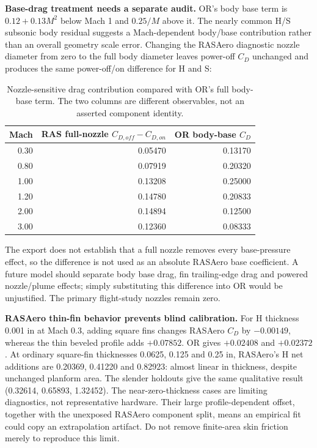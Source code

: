 \documentclass[oneside,openany]{amsdtx}
\begin{document}
\textbf{Base-drag treatment needs a separate audit.} OR's body base term is $0.12+0.13M^2$ below Mach 1 and $0.25/M$ above it. The nearly common H/S subsonic body residual suggests a Mach-dependent body/base contribution rather than an overall geometry scale error. Changing the RASAero diagnostic nozzle diameter from zero to the full body diameter leaves power-off $C_D$ unchanged and produces the same power-off/on difference for H and S:
\begin{table}[H]\centering\small
\caption{Nozzle-sensitive drag contribution compared with OR's full body-base term. The two columns are different observables, not an asserted component identity.}
\begin{tabular}{@{}rrr@{}}\toprule
Mach & RAS full-nozzle $C_{D,off}-C_{D,on}$ & OR body-base $C_D$\\\midrule
0.30 & 0.05470 & 0.13170\\
0.80 & 0.07919 & 0.20320\\
1.00 & 0.13208 & 0.25000\\
1.20 & 0.14780 & 0.20833\\
2.00 & 0.14894 & 0.12500\\
3.00 & 0.12360 & 0.08333\\\bottomrule
\end{tabular}\end{table}
The export does not establish that a full nozzle removes every base-pressure effect, so the difference is not used as an absolute RASAero base coefficient. A future model should separate body base drag, fin trailing-edge drag and powered nozzle/plume effects; simply substituting this difference into OR would be unjustified. The primary flight-study nozzles remain zero.

\textbf{RASAero thin-fin behavior prevents blind calibration.} For H thickness 0.001 in at Mach 0.3, adding square fins changes RASAero $C_D$ by $-0.00149$, whereas the thin beveled profile adds $+0.07852$. OR gives $+0.02408$ and $+0.02372$. At ordinary square-fin thicknesses 0.0625, 0.125 and 0.25 in, RASAero's H net additions are 0.20369, 0.41220 and 0.82923: almost linear in thickness, despite unchanged planform area. The slender holdouts give the same qualitative result (0.32614, 0.65893, 1.32452). The near-zero-thickness cases are limiting diagnostics, not representative hardware. Their large profile-dependent offset, together with the unexposed RASAero component split, means an empirical fit could copy an extrapolation artifact. Do not remove finite-area skin friction merely to reproduce this limit.
\end{document}
